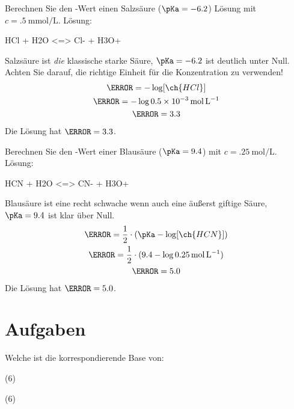 \documentclass{scrartcl}
\begin{document}
\begin{beispiel}
  Berechnen Sie den \pH-Wert einen Salzsäure (\(\pKa=\num{-6.2}\)) Lösung mit
  \(c = \SI{.5}{\milli\mole\per\liter}\).
  \noindent Lösung:
  \begin{reaction*}
    HCl + H2O <=> Cl- + H3O+
  \end{reaction*}
  Salzsäure ist \emph{die} klassische starke Säure, \(\pKa=\num{-6.2}\) ist
  deutlich unter Null.  Achten Sie darauf, die richtige Einheit für die
  Konzentration zu verwenden!
  \begin{gather*}
    \pH = -\log [\ch{HCl}] \\
    \pH = -\log \SI{.5e-3}{\mole\per\liter} \\
    \pH = \num{3.3}
  \end{gather*}
  Die Lösung hat \(\pH = \num{3.3}\).
\end{beispiel}

\begin{beispiel}
  Berechnen Sie den \pH-Wert einer Blausäure (\(\pKa = \num{9.4}\)) mit \(c =
  \SI{.25}{\mole\per\liter}\).
  \noindent Lösung:
  \begin{reaction*}
    HCN + H2O <=> CN- + H3O+
  \end{reaction*}
  Blausäure ist eine recht schwache wenn auch eine äußerst giftige Säure,
  \(\pKa=\num{9.4}\) ist klar über Null.
  \begin{gather*}
    \pH = \frac{1}{2}\cdot(\pKa - \log [\ch{HCN}]) \\
    \pH = \frac{1}{2}\cdot(9.4 - \log \SI{.25}{\mole\per\liter}) \\
    \pH = \num{5.0}
  \end{gather*}
  Die Lösung hat \(\pH = \num{5.0}\).
\end{beispiel}

\newpage
\section{Aufgaben}
\begin{question}
  Welche ist die korrespondierende Base von:
  \begin{tasks}(6)
    \task {}
    \task {}
    \task {}
    \task {}
    \task {}
    \task {}
  \end{tasks}
\end{question}
\begin{solution}
  \begin{tasks}(6)
    \task {}
    \task {}
    \task {}
    \task {}
    \task {}
    \task {}
  \end{tasks}
\end{solution}
\end{document}
